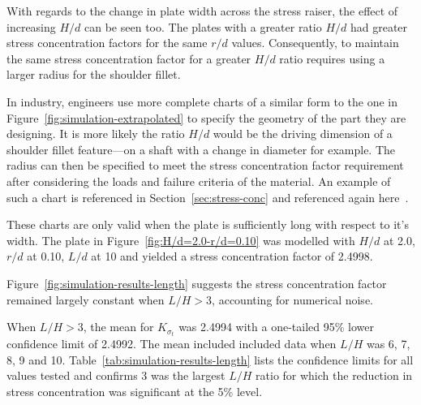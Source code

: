 \documentclass[a4paper,11pt,twocolumn]{article}
\begin{document}
With regards to the change in plate width across the stress raiser, the effect
of increasing $H/d$ can be seen too. The plates with a greater ratio $H/d$ had
greater stress concentration factors for the same $r/d$ values. Consequently,
to maintain the same stress concentration factor for a greater $H/d$
ratio requires using a larger radius for the shoulder fillet.

In industry, engineers use more complete charts of a similar form to the one in
Figure~\ref{fig:simulation-extrapolated} to specify the geometry of the part
they are designing. It is more likely the ratio $H/d$ would be the driving
dimension of a shoulder fillet feature---on a shaft with a change in diameter
for example. The radius can then be specified to meet the stress concentration
factor requirement after considering the loads and failure criteria of the
material. An example of such a chart is referenced in
Section~\ref{sec:stress-conc} and referenced again 
\mbox{here~\cite[p.~151]{pilkey2008peterson}}.

These charts are only valid when the plate is sufficiently long with respect to
it's width. The plate in Figure~\vref{fig:H/d=2.0-r/d=0.10} was modelled with
$H/d$ at 2.0, $r/d$ at 0.10, $L/d$ at 10 and yielded a stress concentration
factor of 2.4998.

Figure~\vref{fig:simulation-results-length} suggests the stress concentration
factor remained largely constant when \mbox{$L/H > 3$}, accounting for numerical
noise.

When \mbox{$L/H > 3$}, the mean for $K_{\sigma_t}$ was 2.4994 with a
one-tailed 95\% lower confidence limit of 2.4992. The mean included included
data when $L/H$ was 6, 7, 8, 9 and 10.
Table~\vref{tab:simulation-results-length} lists the confidence limits for all
values tested and confirms 3 was the largest $L/H$ ratio for which the reduction
in stress concentration was significant at the 5\% level.
\end{document}
